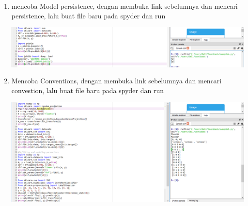 \begin{enumerate}
    \item mencoba Model persistence, dengan membuka link sebelumnya dan mencari persistence, lalu buat file baru pada spyder dan run
    \begin{center}
    \includegraphics[width=.8\textwidth]{figures/1184098/chapter 1/04.png}
    \end{center}
    \item Mencoba Conventions, dengan membuka link sebelumnya dan mencari convestion, lalu buat file baru pada spyder dan run
     \begin{center}
    \includegraphics[width=.8\textwidth]{figures/1184098/chapter 1/05.png}
    \end{center}
\end{enumerate}

